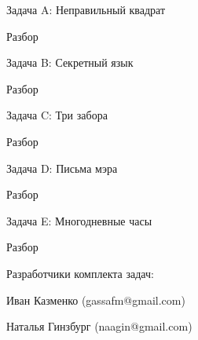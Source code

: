 \documentclass[12pt,a4paper,oneside,twocolumn,landscape]{article}
\newcommand{\sols}[3]%
{

\smallskip
% 


%
%

\bigskip
#3
{\Large Разбор}
\smallskip

% 

}
\begin{document}
\raggedbottom

{\LARGE Задача A: {Неправильный квадрат}}

\sols{abt}{0211}{}

\bigskip
{\LARGE Задача B: {Секретный язык}}

\sols{berg}{0212}{}

\bigskip
\newpage
{\LARGE Задача C: {Три забора}}

\sols{cord}{0213}{}

\bigskip
{\LARGE Задача D: {Письма мэра}}

\sols{dorf}{0214}{}

\bigskip
{\LARGE Задача E: {Многодневные часы}}

\sols{erd}{0215}{\newpage}

\bigskip

{\Large Разработчики комплекта задач:}

Иван Казменко (gassafm@gmail.com)

Наталья Гинзбург (naagin@gmail.com)
\end{document}
